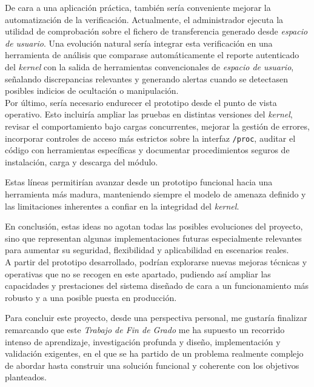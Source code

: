 De cara a una aplicación práctica, también sería conveniente mejorar la automatización de la verificación.
Actualmente, el administrador ejecuta la utilidad de comprobación sobre el fichero de transferencia generado desde \textit{espacio de usuario}.
Una evolución natural sería integrar esta verificación en una herramienta de análisis que comparase automáticamente el reporte autenticado del \textit{kernel} con la salida de herramientas convencionales de \textit{espacio de usuario}, señalando discrepancias relevantes y generando alertas cuando se detectasen posibles indicios de ocultación o manipulación.\\

Por último, sería necesario endurecer el prototipo desde el punto de vista operativo.
Esto incluiría ampliar las pruebas en distintas versiones del \textit{kernel}, revisar el comportamiento bajo cargas concurrentes, mejorar la gestión de errores, incorporar controles de acceso más estrictos sobre la interfaz \texttt{/proc}, auditar el código con herramientas específicas y documentar procedimientos seguros de instalación, carga y descarga del módulo.

Estas líneas permitirían avanzar desde un prototipo funcional hacia una herramienta más madura, manteniendo siempre el modelo de amenaza definido y las limitaciones inherentes a confiar en la integridad del \textit{kernel}.\\

\newpage

En conclusión, estas ideas no agotan todas las posibles evoluciones del proyecto, sino que representan algunas implementaciones futuras especialmente relevantes para aumentar su seguridad, flexibilidad y aplicabilidad en escenarios reales.\\

A partir del prototipo desarrollado, podrían explorarse nuevas mejoras técnicas y operativas que no se recogen en este apartado, pudiendo así ampliar las capacidades y prestaciones del sistema diseñado de cara a un funcionamiento más robusto y a una posible puesta en producción.

\newpage
\thispagestyle{plain}

Para concluir este proyecto, desde una perspectiva personal, me gustaría finalizar remarcando que este \textit{Trabajo de Fin de Grado} me ha supuesto un recorrido intenso de aprendizaje, investigación profunda y diseño, implementación y validación exigentes, en el que se ha partido de un problema realmente complejo de abordar hasta construir una solución funcional y coherente con los objetivos planteados.\\

